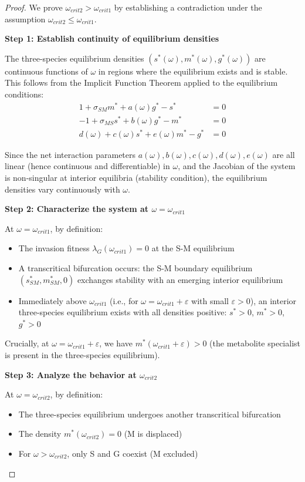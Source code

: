 \documentclass[11pt]{article}
\newtheorem{proof}{Proof}
\begin{document}
\begin{proof}
We prove $\omega_{crit2} > \omega_{crit1}$ by establishing a contradiction under the assumption $\omega_{crit2} \leq \omega_{crit1}$.

\textbf{Step 1: Establish continuity of equilibrium densities}

The three-species equilibrium densities $(s^*(\omega), m^*(\omega), g^*(\omega))$ are continuous functions of $\omega$ in regions where the equilibrium exists and is stable. This follows from the Implicit Function Theorem applied to the equilibrium conditions:
\begin{align}
1 + \sigma_{SM} m^* + a(\omega) g^* - s^* &= 0\\
-1 + \sigma_{MS} s^* + b(\omega) g^* - m^* &= 0\\
d(\omega) + c(\omega) s^* + e(\omega) m^* - g^* &= 0
\end{align}

Since the net interaction parameters $a(\omega), b(\omega), c(\omega), d(\omega), e(\omega)$ are all linear (hence continuous and differentiable) in $\omega$, and the Jacobian of the system is non-singular at interior equilibria (stability condition), the equilibrium densities vary continuously with $\omega$.

\textbf{Step 2: Characterize the system at $\omega = \omega_{crit1}$}

At $\omega = \omega_{crit1}$, by definition:
\begin{itemize}
    \item The invasion fitness $\lambda_G(\omega_{crit1}) = 0$ at the S-M equilibrium
    \item A transcritical bifurcation occurs: the S-M boundary equilibrium $(s^*_{SM}, m^*_{SM}, 0)$ exchanges stability with an emerging interior equilibrium
    \item Immediately above $\omega_{crit1}$ (i.e., for $\omega = \omega_{crit1} + \varepsilon$ with small $\varepsilon > 0$), an interior three-species equilibrium exists with all densities positive: $s^* > 0$, $m^* > 0$, $g^* > 0$
\end{itemize}

Crucially, at $\omega = \omega_{crit1} + \varepsilon$, we have $m^*(\omega_{crit1} + \varepsilon) > 0$ (the metabolite specialist is present in the three-species equilibrium).

\textbf{Step 3: Analyze the behavior at $\omega_{crit2}$}

At $\omega = \omega_{crit2}$, by definition:
\begin{itemize}
    \item The three-species equilibrium undergoes another transcritical bifurcation
    \item The density $m^*(\omega_{crit2}) = 0$ (M is displaced)
    \item For $\omega > \omega_{crit2}$, only S and G coexist (M excluded)
\end{itemize}


\end{proof}
\end{document}
